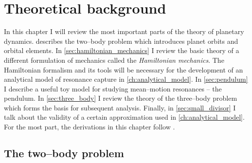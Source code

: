 \documentclass[twoside,openright,titlepage,numbers=noenddot,headinclude,%
                footinclude=true,cleardoublepage=empty,abstractoff, 
                BCOR=5mm,paper=a4,fontsize=11pt,%
                american,%
                ]{scrreprt}%
\begin{document}
\chapter{Theoretical background}
\label{ch:theoretical_background}
In this chapter I will review the most important parts of the theory
of planetary dynamics.  describes the two--body problem which 
introduces planet orbits and orbital elements. In \cref{sec:hamiltonian_mechanics}
I review the basic theory of a different formulation of mechanics called the
\emph{Hamiltonian mechanics}. The Hamiltonian formalism and its tools will
be necessary for the development of an analytical model of resonance
capture in \cref{ch:analytical_model}. In \cref{sec:pendulum}
I describe a useful toy model for studying mean--motion resonances -- the pendulum.
In \cref{sec:three_body} I review the theory of the three--body problem 
which forms the basis for subsequent analysis. Finally, in 
\cref{sec:small_divisor} I talk about the validity of a certain approximation
used in \cref{ch:analytical_model}.
For the most part, the derivations in this chapter follow \citet{murray,Mardling2013}.
\section{The two--body problem}
\label{sec:two_body}
\end{document}
